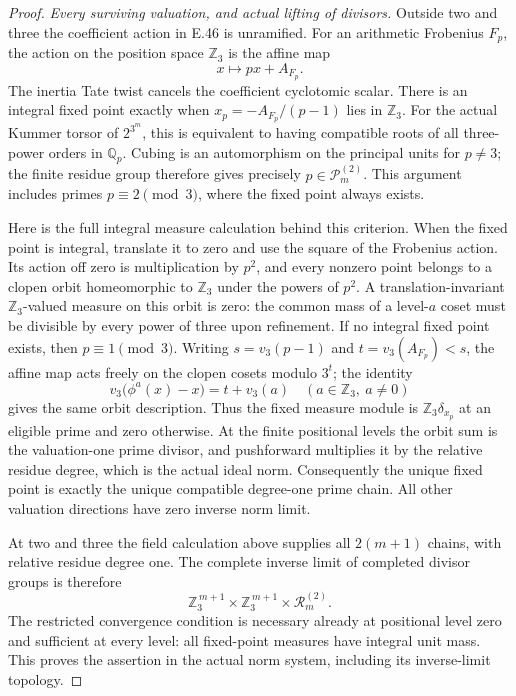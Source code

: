 \begin{proof}
\emph{Every surviving valuation, and actual lifting of divisors.}
Outside two and three
the coefficient action
in E.46 is unramified.
For an arithmetic
Frobenius $F_p$, the
action on the position
space $\mathbb Z_3$
is the affine map
\[
           x\longmapsto p x+A_{F_p}.
 \tag{E52.20}
\]
The inertia Tate twist
cancels the coefficient
cyclotomic scalar.
There is an integral
fixed point exactly
when
$x_p=-A_{F_p}/(p-1)$
lies in $\mathbb Z_3$.
For the actual Kummer
torsor of $2^{3^m}$,
this is equivalent
to having compatible
roots of all
three-power orders
in $\mathbb Q_p$.
Cubing is an
automorphism on the
principal units for
$p\ne3$; the finite
residue group
therefore gives
precisely
$p\in\mathscr P_m^{(2)}$.
This argument includes
primes $p\equiv2\pmod3$,
where the fixed point
always exists.

Here is the full
integral measure
calculation behind
this criterion.
When the fixed point
is integral, translate
it to zero and use
the square of the
Frobenius action.
Its action off zero
is multiplication
by $p^2$, and every
nonzero point belongs
to a clopen orbit
homeomorphic to
$\mathbb Z_3$ under
the powers of $p^2$.
A translation-invariant
$\mathbb Z_3$-valued
measure on this
orbit is zero:
the common mass of
a level-$a$ coset
must be divisible
by every power of
three upon refinement.
If no integral
fixed point exists,
then $p\equiv1\pmod3$.
Writing $s=v_3(p-1)$
and $t=v_3(A_{F_p})<s$,
the affine map acts
freely on the
clopen cosets modulo
$3^t$; the identity
\[
 v_3\bigl(\phi^a(x)-x\bigr)
       =t+v_3(a)
 \quad(a\in\mathbb Z_3,\ a\ne0)
 \tag{E52.21}
\]
gives the same orbit
description. Thus
the fixed measure
module is
$\mathbb Z_3\delta_{x_p}$
at an eligible prime
and zero otherwise.
At the finite
positional levels
the orbit sum is
the valuation-one
prime divisor, and
pushforward multiplies
it by the relative
residue degree,
which is the actual
ideal norm.
Consequently the
unique fixed point
is exactly the unique
compatible degree-one
prime chain. All
other valuation
directions have
zero inverse norm
limit.

At two and three
the field calculation
above supplies all
$2(m+1)$ chains,
with relative
residue degree one.
The complete inverse
limit of completed
divisor groups is
therefore
\[
 \mathbb Z_3^{\,m+1}
     \times\mathbb Z_3^{\,m+1}
                    \times\mathcal R_m^{(2)}.
 \tag{E52.22}
\]
The restricted
convergence condition
is necessary already
at positional level
zero and sufficient
at every level:
all fixed-point
measures have
integral unit mass.
This proves the
assertion in the
actual norm system,
including its
inverse-limit
topology.


\end{proof}
